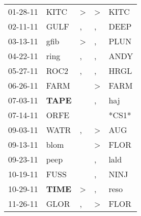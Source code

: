\begin{supertabular}{p{0.07\textwidth}p{0.06\textwidth}p{0.02\textwidth}p{0.02\textwidth}p{0.06\textwidth}}
          01-28-11\textsuperscript{} &           KITC\textsuperscript{} &     \textgreater &     \textgreater &           KITC\textsuperscript{} \\
          02-11-11\textsuperscript{} &           GULF\textsuperscript{} &                , &                , &           DEEP\textsuperscript{} \\
          03-13-11\textsuperscript{} &           gfib\textsuperscript{} &     \textgreater &                , &           PLUN\textsuperscript{} \\
          04-22-11\textsuperscript{} &           ring\textsuperscript{} &                , &                , &           ANDY\textsuperscript{} \\
          05-27-11\textsuperscript{} &           ROC2\textsuperscript{} &                , &                , &           HRGL\textsuperscript{} \\
          06-26-11\textsuperscript{} &           FARM\textsuperscript{} &                  &     \textgreater &           FARM\textsuperscript{} \\
          07-03-11\textsuperscript{} &  \textbf{TAPE\textsuperscript{}} &                  &                , &            haj\textsuperscript{} \\
          07-14-11\textsuperscript{} &           ORFE\textsuperscript{} &                  &                  &                            *CS1* \\
          09-03-11\textsuperscript{} &           WATR\textsuperscript{} &                , &     \textgreater &            AUG\textsuperscript{} \\
          09-13-11\textsuperscript{} &           blom\textsuperscript{} &                  &     \textgreater &           FLOR\textsuperscript{} \\
          09-23-11\textsuperscript{} &           peep\textsuperscript{} &                  &                , &           lald\textsuperscript{} \\
          10-19-11\textsuperscript{} &           FUSS\textsuperscript{} &                  &                , &           NINJ\textsuperscript{} \\
          10-29-11\textsuperscript{} &  \textbf{TIME\textsuperscript{}} &     \textgreater &                , &           reso\textsuperscript{} \\
          11-26-11\textsuperscript{} &           GLOR\textsuperscript{} &                , &     \textgreater &           FLOR\textsuperscript{} \\

\end{supertabular}
